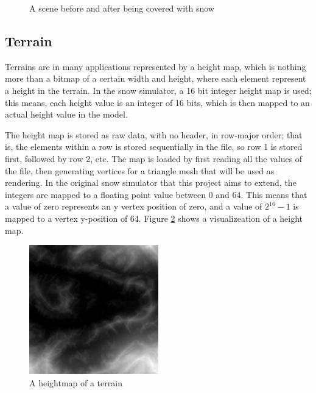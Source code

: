 \begin{figure}[ht]
\caption{A scene before and after being covered with snow}
\label{fig:back_snowsim_screenshots}
\end{figure}


\subsection{Terrain}
Terrains are in many applications represented by a height map, which is nothing more than a bitmap of a certain width and height, where each element represent a height in the terrain. In the snow simulator, a 16 bit integer height map is used; this means, each height value is an integer of 16 bits, which is then mapped to an actual height value in the model. 

The height map is stored as raw data, with no header, in row-major order; that is, the elements within a row is stored sequentially in the file, so row 1 is stored first, followed by row 2, etc. The map is loaded by first reading all the values of the file, then generating vertices for a triangle mesh that will be used as rendering. In the original snow simulator that this project aims to extend, the integers are mapped to a floating point value between 0 and 64. This means that a value of zero represents an y vertex position of zero, and a value of $2^{16}-1$ is mapped to a vertex y-position of 64. Figure \ref{fig:heightmap} shows a visualizeation of a height map.

\begin{figure}[ht]
\centering
\includegraphics[width=0.5\textwidth]{figure/heightmap}
\caption{A heightmap of a terrain}
\label{fig:heightmap}
\end{figure}

